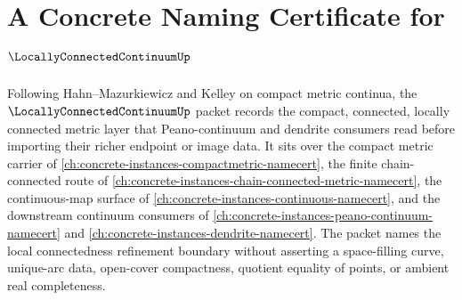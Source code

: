 \chapter{A Concrete Naming Certificate for $\LocallyConnectedContinuumUp$}
\label{ch:concrete-instances-locally-connected-continuum-namecert}

Following Hahn--Mazurkiewicz and Kelley on compact metric continua, the $\LocallyConnectedContinuumUp$ packet records the compact, connected, locally connected metric layer that Peano-continuum and dendrite consumers read before importing their richer endpoint or image data. It sits over the compact metric carrier of \autoref{ch:concrete-instances-compactmetric-namecert}, the finite chain-connected route of \autoref{ch:concrete-instances-chain-connected-metric-namecert}, the continuous-map surface of \autoref{ch:concrete-instances-continuous-namecert}, and the downstream continuum consumers of \autoref{ch:concrete-instances-peano-continuum-namecert} and \autoref{ch:concrete-instances-dendrite-namecert}. The packet names the local connectedness refinement boundary without asserting a space-filling curve, unique-arc data, open-cover compactness, quotient equality of points, or ambient real completeness.

